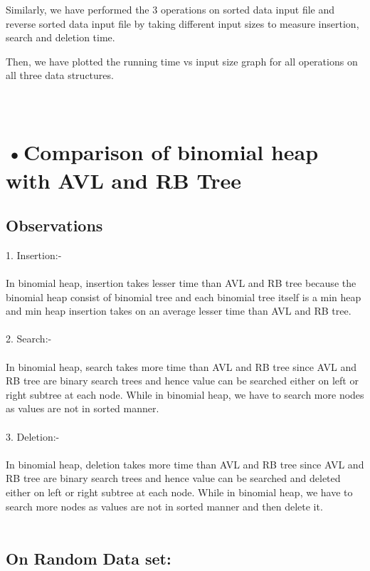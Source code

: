 \documentclass[10pt,a4paper]{article}
\begin{document}
Similarly, we have performed the 3 operations on sorted data input file and reverse sorted data input file by taking different input sizes to measure insertion, search and deletion time. 
		
	Then, we have plotted the running time vs input size graph for all operations on all three data structures.\\


\section*{\\•Comparison of binomial heap with AVL and RB Tree}

\subsection*{Observations}

1. Insertion:- \\ \\
	In binomial heap, insertion takes lesser time than AVL and RB tree because the binomial heap consist of binomial tree and each binomial tree itself is a min heap and min heap insertion takes on an average lesser time than AVL and RB tree.\\ \\
	
2. Search:- \\ \\
	In binomial heap, search takes more time than AVL and RB tree since AVL and RB tree are binary search trees and hence value can be searched either on left or right subtree at each node. While in binomial heap, we have to search more nodes as values are not in sorted manner. \\ \\

3. Deletion:- \\ \\
	In binomial heap, deletion takes more time than AVL and RB tree since AVL and RB tree are binary search trees and hence value can be searched and deleted either on left or right subtree at each node. While in binomial heap, we have to search more nodes as values are not in sorted manner and then delete it. \\ \\
	
\subsection*{On Random Data set:}
\end{document}
